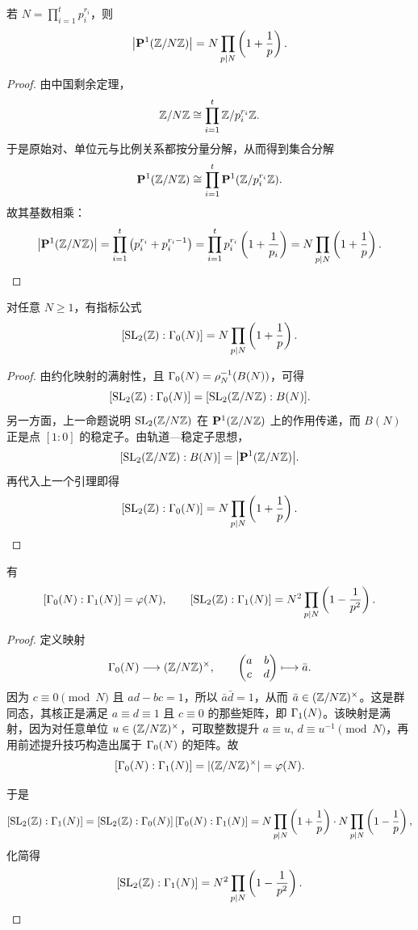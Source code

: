 \begin{lemma}
若 $N=\prod_{i=1}^t p_i^{r_i}$，则
\[
\bigl|\mathbf{P}^1(\mathbb{Z}/N\mathbb{Z})\bigr|=N\prod_{p\mid N}\left(1+\frac1p\right).
\]
\end{lemma}

\begin{proof}
由中国剩余定理，
\[
\mathbb{Z}/N\mathbb{Z}\cong \prod_{i=1}^t \mathbb{Z}/p_i^{r_i}\mathbb{Z}.
\]
于是原始对、单位元与比例关系都按分量分解，从而得到集合分解
\[
\mathbf{P}^1(\mathbb{Z}/N\mathbb{Z})
\cong
\prod_{i=1}^t \mathbf{P}^1(\mathbb{Z}/p_i^{r_i}\mathbb{Z}).
\]
故其基数相乘：
\[
\bigl|\mathbf{P}^1(\mathbb{Z}/N\mathbb{Z})\bigr|
=\prod_{i=1}^t\left(p_i^{r_i}+p_i^{r_i-1}\right)
=\prod_{i=1}^t p_i^{r_i}\left(1+\frac1{p_i}\right)
=N\prod_{p\mid N}\left(1+\frac1p\right).
\]
\end{proof}

\begin{theorem}
对任意 $N\ge 1$，有指标公式
\[
[\mathrm{SL}_2(\mathbb{Z}):\Gamma_0(N)]
= N\prod_{p\mid N}\left(1+\frac1p\right).
\]
\end{theorem}

\begin{proof}
由约化映射的满射性，且 $\Gamma_0(N)=\rho_N^{-1}(B(N))$，可得
\[
[\mathrm{SL}_2(\mathbb{Z}):\Gamma_0(N)]
=[\mathrm{SL}_2(\mathbb{Z}/N\mathbb{Z}):B(N)].
\]
另一方面，上一命题说明 $\mathrm{SL}_2(\mathbb{Z}/N\mathbb{Z})$ 在 $\mathbf{P}^1(\mathbb{Z}/N\mathbb{Z})$ 上的作用传递，而 $B(N)$ 正是点 $[1:0]$ 的稳定子。由轨道—稳定子思想，
\[
[\mathrm{SL}_2(\mathbb{Z}/N\mathbb{Z}):B(N)]
=\bigl|\mathbf{P}^1(\mathbb{Z}/N\mathbb{Z})\bigr|.
\]
再代入上一个引理即得
\[
[\mathrm{SL}_2(\mathbb{Z}):\Gamma_0(N)]
= N\prod_{p\mid N}\left(1+\frac1p\right).
\]
\end{proof}

\begin{corollary}
有
\[
[\Gamma_0(N):\Gamma_1(N)]=\varphi(N),
\qquad
[\mathrm{SL}_2(\mathbb{Z}):\Gamma_1(N)]
= N^2\prod_{p\mid N}\left(1-\frac1{p^2}\right).
\]
\end{corollary}

\begin{proof}
定义映射
\[
\Gamma_0(N)\longrightarrow (\mathbb{Z}/N\mathbb{Z})^\times,
\qquad
\begin{pmatrix} a&b\\ c&d \end{pmatrix}\longmapsto \bar a.
\]
因为 $c\equiv 0\pmod N$ 且 $ad-bc=1$，所以 $\bar a\bar d=1$，从而 $\bar a\in (\mathbb{Z}/N\mathbb{Z})^\times$。这是群同态，其核正是满足 $a\equiv d\equiv 1$ 且 $c\equiv 0$ 的那些矩阵，即 $\Gamma_1(N)$。该映射是满射，因为对任意单位 $u\in (\mathbb{Z}/N\mathbb{Z})^\times$，可取整数提升 $a\equiv u$, $d\equiv u^{-1}\pmod N$，再用前述提升技巧构造出属于 $\Gamma_0(N)$ 的矩阵。故
\[
[\Gamma_0(N):\Gamma_1(N)]=|(\mathbb{Z}/N\mathbb{Z})^\times|=\varphi(N).
\]

于是
\[
[\mathrm{SL}_2(\mathbb{Z}):\Gamma_1(N)]
=[\mathrm{SL}_2(\mathbb{Z}):\Gamma_0(N)]\,[\Gamma_0(N):\Gamma_1(N)]
=N\prod_{p\mid N}\left(1+\frac1p\right)\cdot N\prod_{p\mid N}\left(1-\frac1p\right),
\]
化简得
\[
[\mathrm{SL}_2(\mathbb{Z}):\Gamma_1(N)]
=N^2\prod_{p\mid N}\left(1-\frac1{p^2}\right).
\]
\end{proof}

